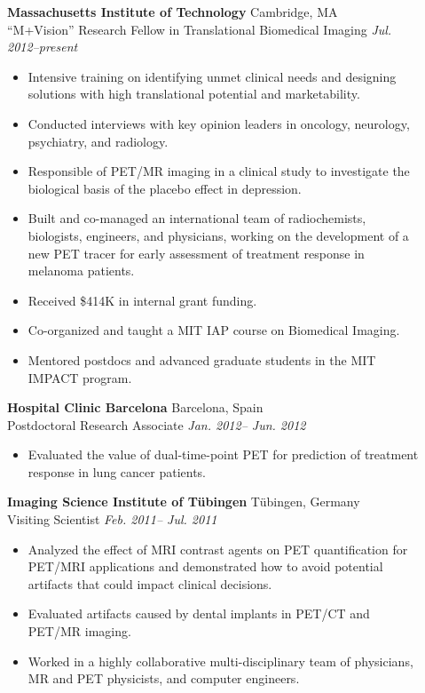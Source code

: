 \documentclass[letterpaper]{article}
\begin{document}
\begin{description}
\item[] \textbf{Massachusetts Institute of Technology} \hfill Cambridge, MA \\
``M+Vision'' Research Fellow in Translational Biomedical Imaging \hfill \textit{Jul. 2012--present} 
\vspace*{-0.2cm}
\begin{itemize} 
\item Intensive training on identifying unmet clinical needs and designing
    solutions with high translational potential and marketability.
 \item Conducted interviews with key opinion leaders in oncology, neurology, psychiatry, and radiology.
 \item Responsible of PET/MR imaging in a clinical study to investigate the biological basis of the placebo effect in depression.
\item Built and co-managed an international team of radiochemists, biologists, engineers, and physicians, working on the development of a new PET tracer for early assessment of treatment response in melanoma patients. 
\item Received \$414K in internal grant funding. 
\item Co-organized and taught a MIT IAP course on Biomedical Imaging.
\item Mentored postdocs and advanced graduate students in the MIT IMPACT program.
\end{itemize}

\item[]
    \textbf{Hospital Clinic Barcelona} \hfill Barcelona, Spain 
\\
Postdoctoral Research Associate \hfill  \textit{Jan. 2012-- Jun. 2012}
\vspace*{-0.2cm}
\begin{itemize}
\item Evaluated the value of dual-time-point PET for prediction of treatment response in lung
cancer patients.
\end{itemize}

\item[] \textbf{Imaging Science Institute of T\"ubingen} \hfill T\"ubingen, Germany \\
Visiting Scientist \hfill  \textit{Feb. 2011-- Jul. 2011} 
\vspace*{-0.2cm}
\begin{itemize}
\item Analyzed the effect of MRI contrast agents on PET quantification for PET/MRI
applications and demonstrated how to avoid potential artifacts that could impact clinical decisions.
\item Evaluated artifacts caused by dental implants in PET/CT and PET/MR imaging.
\item Worked in a highly collaborative multi-disciplinary team of physicians, MR and PET physicists, and computer engineers.  
\end{itemize}


\end{description}
\end{document}
